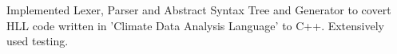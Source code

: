 \documentclass[]{rinkal_resume}
\begin{document}
\begin{minipage}[t]{0.69\textwidth}
\begin{tightemize}
\item Implemented Lexer, Parser and Abstract Syntax Tree and Generator to covert HLL code written in 'Climate Data Analysis Language' to C++. Extensively used testing.
\end{tightemize}
\smallsectionsep

\end{minipage} 
\end{document}

